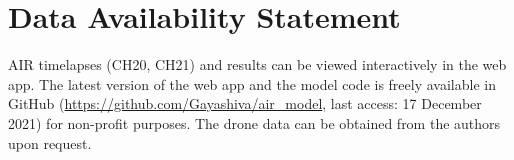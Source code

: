 \documentclass[utf8]{frontiersSCNS}
\begin{document}
\section*{Data Availability Statement} AIR timelapses (CH20, CH21) and results can be viewed interactively in
the web app.  The latest version of the web app and the model code  is freely available in GitHub
(\url{https://github.com/Gayashiva/air_model}, last access: 17 December 2021) for non-profit purposes. The drone
data can be obtained from the authors upon request.

 
\end{document}
